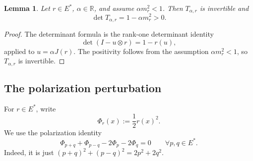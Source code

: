 \documentclass[a4paper,11pt]{article}
\numberwithin{equation}{section}
\newtheorem{lemma}[theorem]{Lemma}
\newcommand{\R}{\mathbb{R}}
\begin{document}
	
	\begin{lemma}
		\label{lem:rank-one-extension}
		Let \(r\in E^*\), \(\alpha\in\R\), and assume \(\alpha m_r^2<1\). Then
		\(T_{\alpha,r}\) is invertible and
		\[
		\det T_{\alpha,r}=1-\alpha m_r^2>0.
		\]
	\end{lemma}
	
	\begin{proof}
		The determinant formula is the rank-one determinant identity
		\[
		\det(I-u\otimes r)=1-r(u),
		\]
		applied to \(u=\alpha J(r)\). The positivity follows from the assumption \(\alpha m_r^2<1\), so \(T_{\alpha,r}\) is invertible.
		
	\end{proof}
	
	\subsection{The polarization perturbation}\label{subsec:polarization-perturbation}
	
	For \(r\in E^*\), write
	\[
	\Phi_r(x):=\frac12 r(x)^2.
	\]
	We use the polarization identity
	\begin{equation}\label{eq:polarization-zero-sum}
		\Phi_{p+q}+\Phi_{p-q}-2\Phi_p-2\Phi_q=0
		\qquad\forall p,q\in E^*.
	\end{equation}
	Indeed, it is just
	\((p+q)^2+(p-q)^2=2p^2+2q^2\).
	
\end{document}
